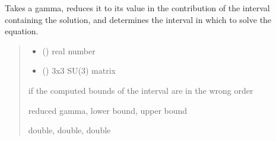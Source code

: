 \documentclass[letterpaper,10pt,english]{sphinxmanual}
\begin{document}
\begin{fulllineitems}
\label{\detokenize{numerical_reject:numerical_reject.reduce_gamma_8}}
\pysigstartsignatures
\pysiglinewithargsret
{}
{\sphinxparamcomma {}}
{}
\pysigstopsignatures
\sphinxAtStartPar
Takes a gamma, reduces it to its value in the contribution of the interval containing the solution, and determines the interval in which to solve the equation.
\begin{quote}\begin{description}
\begin{itemize}
\item {} 
\sphinxAtStartPar
{} () \textendash{} real number

\item {} 
\sphinxAtStartPar
{} () \textendash{} 3x3 SU(3) matrix

\end{itemize}

\sphinxAtStartPar
{} \textendash{} if the computed bounds of the interval are in the wrong order

\sphinxAtStartPar
reduced gamma, lower bound, upper bound

\sphinxAtStartPar
double, double, double

\end{description}\end{quote}

\end{fulllineitems}

\end{document}
